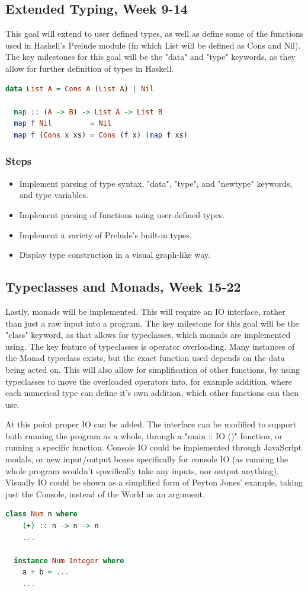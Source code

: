 \documentclass[a4paper]{article}
\begin{document}
\subsection{Extended Typing, Week 9-14}
\label{extended-typing}
This goal will extend to user defined types, as well as define some of the functions used in Haskell's Prelude module (in which List will be defined as Cons and Nil). The key milestones for this goal will be the "data" and "type" keywords, as they allow for further definition of types in Haskell.
\begin{lstlisting}[language=haskell, caption=Example functions/types of stage 2.]
  data List A = Cons A (List A) | Nil

  map :: (A -> B) -> List A -> List B
  map f Nil         = Nil
  map f (Cons x xs) = Cons (f x) (map f xs)
\end{lstlisting}
\subsubsection{Steps}
\begin{itemize}
    \item Implement parsing of type syntax, "data", "type", and "newtype" keywords, and type variables.
    \item Implement parsing of functions using user-defined types.
    \item Implement a variety of Prelude's built-in types.
    \item Display type construction in a visual graph-like way.
\end{itemize}
\subsection{Typeclasses and Monads, Week 15-22}
Lastly, monads will be implemented. This will require an IO interface, rather than just a raw input into a program. The key milestone for this goal will be the "class" keyword, as that allows for typeclasses, which monads are implemented using.
The key feature of typeclasses is operator overloading. Many instances of the Monad typeclass exists, but the exact function used depends on the data being acted on.
This will also allow for simplification of other functions, by using typeclasses to move the overloaded operators into, for example addition, where each numerical type can define it's own addition, which other functions can then use.

At this point proper IO can be added. The interface can be modified to support both running the program as a whole, through a "main :: IO ()" function, or running a specific function. Console IO could be implemented through JavaScript modals, or new input/output boxes specifically for console IO (as running the whole program wouldn't specifically take any inputs, nor output anything). Visually IO could be shown as a simplified form of Peyton Jones' example, taking just the Console, instead of the World as an argument.
\begin{lstlisting}[language=haskell, caption=The Num typeclass. (+) would be implemented in JavaScript.]
  class Num n where
    (+) :: n -> n -> n
    ...

  instance Num Integer where
    a + b = ...
    ...
\end{lstlisting}
\end{document}
